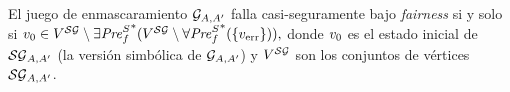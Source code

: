 \begin{theorem}\label{theo:decide-stopping}

El juego de enmascaramiento 
 $\mathcal{G}_{A,A'}$ falla casi-seguramente bajo \emph{fairness}  si y solo si
$
  v_0 \in V^{\mathcal{SG}} \setminus {\exists\mathit{Pre}^S_f}^*(V^{\mathcal{SG}} \setminus {\forall\mathit{Pre}^S_f}^*(\{ v_{\text{err}} \})),
$
donde $v_0$ es el estado inicial de $\mathcal{SG}_{A,A'}$ (la versión simbólica de $\mathcal{G}_{A,A'}$) y $V^{\mathcal{SG}}$ son los conjuntos de vértices $\mathcal{SG}_{A,A'}$.
\end{theorem}
\iffalse
\noindent
